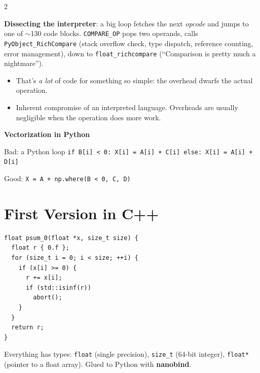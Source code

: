 \documentclass[a4paper,9pt]{extarticle}
\begin{document}
\begin{multicols}{2}
\begin{important}
\textbf{Dissecting the interpreter}: a big loop fetches the next \emph{opcode} and jumps to one of
$\sim$130 code blocks. \texttt{COMPARE\_OP} pops two operands, calls
\texttt{PyObject\_RichCompare} (stack overflow check, type dispatch, reference counting, error
management), down to \texttt{float\_richcompare} (``Comparison is pretty much a nightmare'').

\begin{itemize}

\item That's \emph{a lot} of code for something so simple: the overhead dwarfs the actual
operation.

\item Inherent compromise of an interpreted language. Overheads are usually negligible when the
operation does more work.

\end{itemize}

\end{important}


\begin{example}

\textbf{Vectorization in Python}

Bad: a Python loop \texttt{if B[i] < 0: X[i] = A[i] + C[i] else: X[i] = A[i] + D[i]}

Good: \texttt{X = A + np.where(B < 0, C, D)}

\end{example}



\section{First Version in C++}


\begin{example}

\begin{verbatim}
float psum_0(float *x, size_t size) {
  float r { 0.f };
  for (size_t i = 0; i < size; ++i) {
    if (x[i] >= 0) {
      r += x[i];
      if (std::isinf(r))
        abort();
    }
  }
  return r;
}
\end{verbatim}

Everything has types: \texttt{float} (single precision), \texttt{size\_t} (64-bit integer),
\texttt{float*} (pointer to a float array). Glued to Python with \textbf{nanobind}.

\end{example}



\end{multicols}
\end{document}
